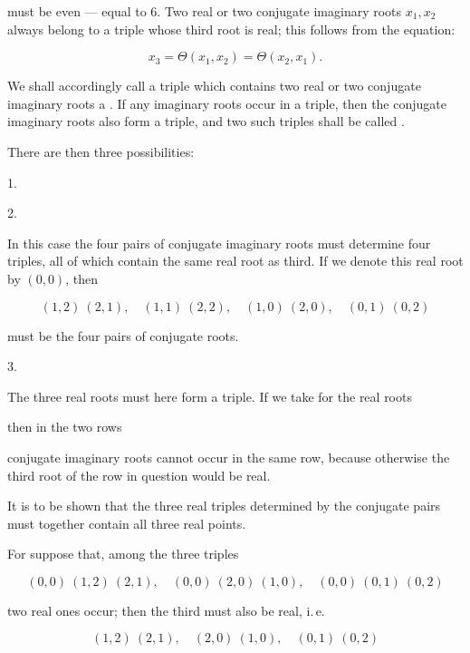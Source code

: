 must be even — equal to 6. Two real or two conjugate imaginary roots
$x_1, x_2$ always belong to a triple whose third root is real; this
follows from the equation:

\[
x_3 = \Theta (x_1, x_2) = \Theta (x_2, x_1).
\]

We shall accordingly call a triple which contains two real or two conjugate
imaginary roots a . If any imaginary roots occur in a
triple, then the conjugate imaginary roots also form a triple, and two such
triples shall be called .

There are then three possibilities:

1. 

2. 

In this case the four pairs of conjugate imaginary roots must determine four
triples, all of which contain the same real root as third. If we denote
this real root by $(0,0)$, then

\[
(1,2)\ (2,1),\quad (1,1)\ (2,2),\quad (1,0)\ (2,0),\quad (0,1)\ (0,2)
\]

must be the four pairs of conjugate roots.

3. 

The three real roots must here form a triple. If we take for the real
roots


then in the two rows


conjugate imaginary roots cannot occur in the same row, because otherwise
the third root of the row in question would be real.

It is to be shown that the three real triples determined by the conjugate
pairs must together contain all three real points.

For suppose that, among the three triples

\[
(0,0)\ (1,2)\ (2,1),\quad (0,0)\ (2,0)\ (1,0),\quad (0,0)\ (0,1)\ (0,2)
\]

two real ones occur; then the third must also be real, i.\,e.

\[
(1,2)\ (2,1),\quad (2,0)\ (1,0),\quad (0,1)\ (0,2)
\]
